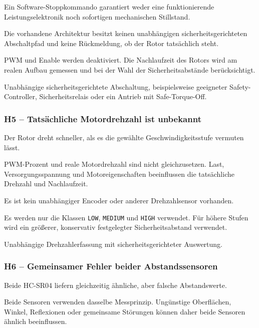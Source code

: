 Ein Software-Stoppkommando garantiert weder eine funktionierende
Leistungselektronik noch sofortigen mechanischen Stillstand.

Die vorhandene Architektur besitzt keinen unabhängigen sicherheitsgerichteten
Abschaltpfad und keine Rückmeldung, ob der Rotor tatsächlich steht.

PWM und Enable werden deaktiviert. Die Nachlaufzeit des Rotors wird am realen
Aufbau gemessen und bei der Wahl der Sicherheitsabstände berücksichtigt.

Unabhängige sicherheitsgerichtete Abschaltung, beispielsweise geeigneter
Safety-Controller, Sicherheitsrelais oder ein Antrieb mit Safe-Torque-Off.

\subsubsection{H5 -- Tatsächliche Motordrehzahl ist unbekannt}
\label{haz:h5}

Der Rotor dreht schneller, als es die gewählte Geschwindigkeitsstufe vermuten
lässt.

PWM-Prozent und reale Motordrehzahl sind nicht gleichzusetzen. Last,
Versorgungsspannung und Motoreigenschaften beeinflussen die tatsächliche
Drehzahl und Nachlaufzeit.

Es ist kein unabhängiger Encoder oder anderer Drehzahlsensor vorhanden.

Es werden nur die Klassen \texttt{LOW}, \texttt{MEDIUM} und \texttt{HIGH}
verwendet. Für höhere Stufen wird ein größerer, konservativ festgelegter
Sicherheitsabstand verwendet.

Unabhängige Drehzahlerfassung mit sicherheitsgerichteter Auswertung.

\subsubsection{H6 -- Gemeinsamer Fehler beider Abstandssensoren}
\label{haz:h6}

Beide HC-SR04 liefern gleichzeitig ähnliche, aber falsche Abstandswerte.

Beide Sensoren verwenden dasselbe Messprinzip. Ungünstige Oberflächen, Winkel,
Reflexionen oder gemeinsame Störungen können daher beide Sensoren ähnlich
beeinflussen.

